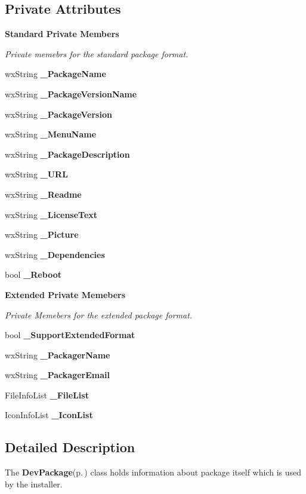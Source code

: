 \subsection*{Private Attributes}
\begin{Indent}{\bf Standard Private Members}\par
{\em Private memebrs for the standard package format. }\begin{CompactItemize}
\item 
wx\-String {\bf \_\-Package\-Name}
\item 
wx\-String {\bf \_\-Package\-Version\-Name}
\item 
wx\-String {\bf \_\-Package\-Version}
\item 
wx\-String {\bf \_\-Menu\-Name}
\item 
wx\-String {\bf \_\-Package\-Description}
\item 
wx\-String {\bf \_\-URL}
\item 
wx\-String {\bf \_\-Readme}
\item 
wx\-String {\bf \_\-License\-Text}
\item 
wx\-String {\bf \_\-Picture}
\item 
wx\-String {\bf \_\-Dependencies}
\item 
bool {\bf \_\-Reboot}
\end{CompactItemize}
\end{Indent}
\begin{Indent}{\bf Extended Private Memebers}\par
{\em Private Memebers for the extended package format. }\begin{CompactItemize}
\item 
bool {\bf \_\-Support\-Extended\-Format}
\item 
wx\-String {\bf \_\-Packager\-Name}
\item 
wx\-String {\bf \_\-Packager\-Email}
\item 
File\-Info\-List {\bf \_\-File\-List}
\item 
Icon\-Info\-List {\bf \_\-Icon\-List}
\end{CompactItemize}
\end{Indent}


\subsection{Detailed Description}
The {\bf Dev\-Package}{\rm (p.\,\pageref{class_dev_package})} class holds information about package itself which is used by the installer. 

